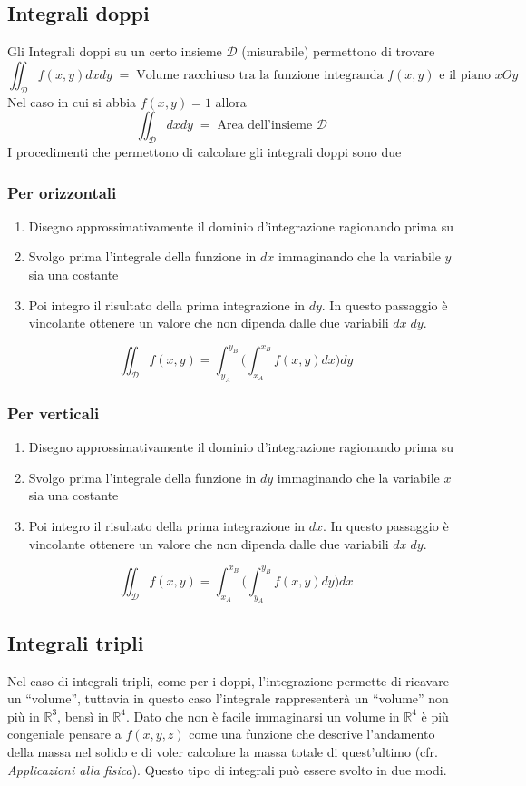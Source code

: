 \documentclass[10pt,a4paper]{report}
\newcommand{\erre}[1]{$\mathbb{R}^{#1}$}
\begin{document}
		\subsection*{Integrali doppi}
			Gli Integrali doppi su un certo insieme $ \mathcal{D} $ (misurabile) permettono di trovare
			\[ \iint_{\mathcal{D}} f(x,y)dxdy \; = \; \textrm{Volume racchiuso tra la funzione integranda } f(x,y) \textrm{ e il piano } xOy \]
			Nel caso in cui si abbia $ f(x,y) = 1 $ allora 
			\[ \iint_{\mathcal{D}} dxdy \; = \; \text{Area dell'insieme $\mathcal{D}$  }\]
			I procedimenti che permettono di calcolare gli integrali doppi sono due
				\subsubsection{Per orizzontali}
				\begin{enumerate}
					\item Disegno approssimativamente il dominio d'integrazione ragionando prima su
					\item Svolgo prima l'integrale della funzione in $ dx $ immaginando che la variabile $ y $ sia una costante
					\item Poi integro il risultato della prima integrazione in $ dy $. In questo passaggio è vincolante ottenere un valore che non dipenda dalle due variabili $ dx \; dy $.
				\end{enumerate}
				\[ \iint_{\mathcal{D}} f(x,y) = \int_{y_{A}}^{y_{B}} \Big(\int_{x_{A}}^{x_{B}}f(x,y) dx\Big) dy \]
				\subsubsection{Per verticali}
				\begin{enumerate}
					\item Disegno approssimativamente il dominio d'integrazione ragionando prima su
					\item Svolgo prima l'integrale della funzione in $ dy $ immaginando che la variabile $ x $ sia una costante
					\item Poi integro il risultato della prima integrazione in $ dx $. In questo passaggio è vincolante ottenere un valore che non dipenda dalle due variabili $ dx \; dy $.
				\end{enumerate}
				\[ \iint_{\mathcal{D}} f(x,y) = \int_{x_{A}}^{x_{B}} \Big(\int_{y_{A}}^{y_{B}}f(x,y) dy\Big) dx \]
				
		\subsection*{Integrali tripli}
		Nel caso di integrali tripli, come per i doppi, l'integrazione permette di ricavare un ``volume'', tuttavia in questo caso l'integrale rappresenterà un ``volume'' non più in \erre{3}, bensì in \erre{4}. Dato che non è facile immaginarsi un volume in $\mathbb{R}^{4}$ è più congeniale pensare a $f(x,y,z)$ come una funzione che descrive l'andamento della massa nel solido e di voler calcolare la massa totale di quest'ultimo (cfr. \textit{Applicazioni alla fisica}).
		Questo tipo di integrali può essere svolto in due modi.
\end{document}
